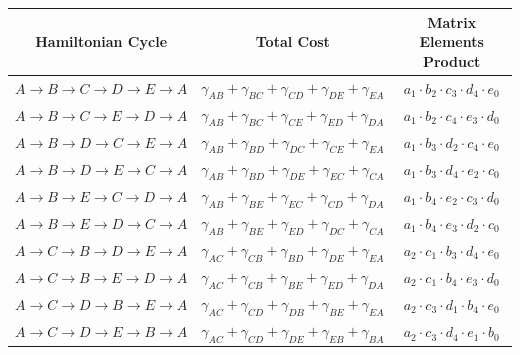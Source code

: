 \documentclass[msc,oneside]{ubcthesis}
\begin{document}
	
	\begin{table}[h]
		\centering
		\begin{tabular}{|c|c|c|}
			\hline
			\textbf{Hamiltonian Cycle} & \textbf{Total Cost} & \textbf{Matrix Elements Product} \\
			\hline
$A \rightarrow B \rightarrow C \rightarrow D \rightarrow E \rightarrow A$ & $ \gamma_{AB} + \gamma_{BC} + \gamma_{CD} + \gamma_{DE} + \gamma_{EA}$ & $a_1  \cdot b_2 \cdot c_3 \cdot d_4 \cdot e_0$ \\
$A \rightarrow B \rightarrow C \rightarrow E \rightarrow D \rightarrow A$ & $ \gamma_{AB} + \gamma_{BC} + \gamma_{CE} + \gamma_{ED} + \gamma_{DA}$ & $a_1  \cdot b_2 \cdot c_4 \cdot e_3 \cdot d_0$ \\
$A \rightarrow B \rightarrow D \rightarrow C \rightarrow E \rightarrow A$ & $ \gamma_{AB} + \gamma_{BD} + \gamma_{DC} + \gamma_{CE} + \gamma_{EA}$ & $a_1  \cdot b_3 \cdot d_2 \cdot c_4 \cdot e_0$ \\
$A \rightarrow B \rightarrow D \rightarrow E \rightarrow C \rightarrow A$ & $ \gamma_{AB} + \gamma_{BD} + \gamma_{DE} + \gamma_{EC} + \gamma_{CA}$ & $a_1  \cdot b_3 \cdot d_4 \cdot e_2 \cdot c_0$ \\
$A \rightarrow B \rightarrow E \rightarrow C \rightarrow D \rightarrow A$ & $ \gamma_{AB} + \gamma_{BE} + \gamma_{EC} + \gamma_{CD} + \gamma_{DA}$ & $a_1  \cdot b_4 \cdot e_2 \cdot c_3 \cdot d_0$ \\
$A \rightarrow B \rightarrow E \rightarrow D \rightarrow C \rightarrow A$ & $ \gamma_{AB} + \gamma_{BE} + \gamma_{ED} + \gamma_{DC} + \gamma_{CA}$ & $a_1  \cdot b_4 \cdot e_3 \cdot d_2 \cdot c_0$ \\
$A \rightarrow C \rightarrow B \rightarrow D \rightarrow E \rightarrow A$ & $ \gamma_{AC} + \gamma_{CB} + \gamma_{BD} + \gamma_{DE} + \gamma_{EA}$ & $a_2  \cdot c_1 \cdot b_3 \cdot d_4 \cdot e_0$ \\
$A \rightarrow C \rightarrow B \rightarrow E \rightarrow D \rightarrow A$ & $ \gamma_{AC} + \gamma_{CB} + \gamma_{BE} + \gamma_{ED} + \gamma_{DA}$ & $a_2  \cdot c_1 \cdot b_4 \cdot e_3 \cdot d_0$ \\
$A \rightarrow C \rightarrow D \rightarrow B \rightarrow E \rightarrow A$ & $ \gamma_{AC} + \gamma_{CD} + \gamma_{DB} + \gamma_{BE} + \gamma_{EA}$ & $a_2  \cdot c_3 \cdot d_1 \cdot b_4 \cdot e_0$ \\
$A \rightarrow C \rightarrow D \rightarrow E \rightarrow B \rightarrow A$ & $ \gamma_{AC} + \gamma_{CD} + \gamma_{DE} + \gamma_{EB} + \gamma_{BA}$ & $a_2  \cdot c_3 \cdot d_4 \cdot e_1 \cdot b_0$ \\

\end{tabular}
\end{table}
\end{document}
